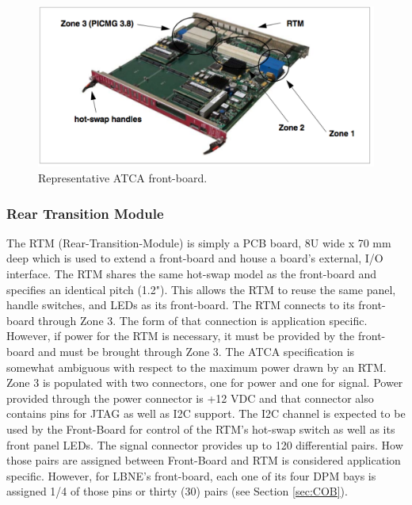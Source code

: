 \begin{figure}[tbh]
\includegraphics[scale=0.8]{front-boardpdf.pdf}
\caption{Representative ATCA front-board.}
\label{fig:frontBoard}
\end{figure} 

\subsubsection{Rear Transition Module}
\label{sec:rtm}
The RTM (Rear-Transition-Module) is simply a PCB board, 8U wide x 70 mm deep which is used to extend a front-board and  house a board's external, I/O interface. The RTM shares the same hot-swap model as the front-board and specifies an identical pitch (1.2"). This allows the RTM to reuse the same panel, handle switches, and LEDs as its front-board. The RTM connects to its front-board through Zone 3. The form of that connection is application specific. However, if power for the RTM is necessary, it must be provided by the front-board and must be brought through Zone 3. The ATCA specification is somewhat ambiguous with respect to the maximum power drawn by an RTM.   Zone 3 is populated with two connectors, one for power and one for signal. Power provided through the power connector is +12 VDC and that connector also contains pins for JTAG as well as I2C support. The I2C channel is expected to be used by the Front-Board for control of the RTM's hot-swap switch as well as its front panel LEDs.
The signal connector provides up to 120 differential pairs. How those pairs are assigned between Front-Board and RTM is considered application specific. However, for LBNE's front-board, each one of its four DPM bays is assigned 1/4 of those pins or thirty (30) pairs (see Section \ref{sec:COB}).

